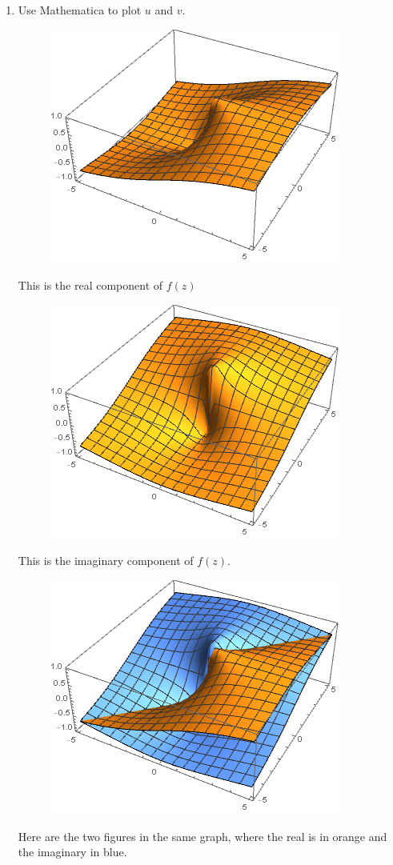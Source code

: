 \documentclass{article}
\begin{document}
\begin{enumerate}
\begin{enumerate}
		\item Use Mathematica to plot $u$ and $v$.
		\begin{figure}[H]
		\includegraphics[scale=0.8]{image1.png}
		\end{figure}
		This is the real component of $f(z)$
		\begin{figure}[H]
		\includegraphics[scale=0.8]{image2.png}
		\end{figure}
		This is the imaginary component of $f(z)$.
		\begin{figure}[H]
		\includegraphics[scale=0.8]{image3.png}
		\end{figure}
		Here are the two figures in the same graph, where the real is in orange and the imaginary in blue.
		

\end{enumerate}
\end{enumerate}
\end{document}
